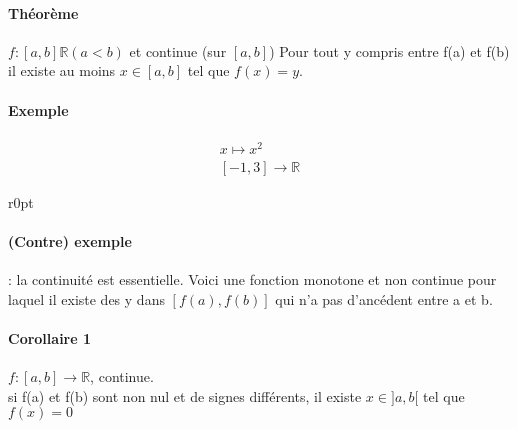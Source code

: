 \paragraph{Théorème} $f:[a, b] \mathbb{R} (a < b)$ et continue (sur $[a, b]$)
Pour tout y compris entre f(a) et f(b) il existe au moins $x\in [a, b]$ tel que $f(x) = y$.
\paragraph{Exemple} \begin{align*}
	x \mapsto x^2\\
	[-1, 3] \rightarrow \mathbb{R}
\end{align*}

\newpage

\begin{wrapfigure}[5]{r}{0pt}
\end{wrapfigure}
\paragraph{(Contre) exemple} : la continuité est essentielle. 
Voici une fonction monotone et non continue pour laquel il existe des y dans $[f(a), f(b)]$ qui n'a pas d'ancédent entre a et b.
\paragraph{Corollaire 1} $f:[a, b] \rightarrow \mathbb{R}$, continue. ~\\
si f(a) et f(b) sont non nul et de signes différents, il existe $x \in ]a, b[$ tel que $f(x) = 0$
